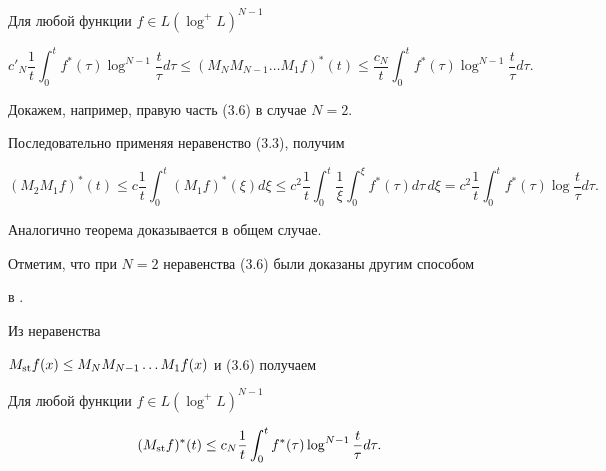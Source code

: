  


\begin{thm} Для любой функции $f\in L(\log^+L)^{N-1}$ 


\begin{equation} 


c'_N\frac{1}{t}\int^t_0 f^*(\tau)\log^{N-1}\frac{t}{\tau}d\tau \le 


(M_N M_{N-1}\dots M_1f)^*(t)\le 


\frac{c_N}{t}\int^t_0 f^*(\tau)\log^{N-1}\frac{t}{\tau}d\tau. 


\end{equation} 


\end{thm} 


 


\begin{pf} Докажем, например, правую часть (3.6) в случае $N=2$. 


Последовательно применяя неравенство (3.3), получим 


$$ 


(M_2 M_1 f)^*(t)\le c\frac{1}{t}\int^t_0(M_1 f)^*(\xi)d\xi \le 


c^2\frac{1}{t}\int^t_0\frac{1}{\xi}\int^\xi_0 f^*(\tau)d\tau\,d\xi= 


c^2\frac{1}{t}\int^t_0 f^*(\tau)\log\frac{t}{\tau}d\tau. 


$$ 


Аналогично теорема доказывается в общем случае. 


\end{pf} 


 


Отметим, что при $N=2$ неравенства (3.6) были доказаны другим способом 


в \cite{Sto}. 


 


Из неравенства 


$M_{\operatorname{st}} f(x)\le M_N M_{N-1}\dots M_1f(x)$ и (3.6) получаем 


 


\begin{cor} Для любой функции $f\in L(\log^+L)^{N-1}$ 


\begin{equation} 


(M_{\st} f)^*(t)\le c_N\frac{1}{t}\int^t_0 f^*(\tau)\log^{N-1} 


\frac{t}{\tau}d\tau. 


\end{equation} 


\end{cor} 


